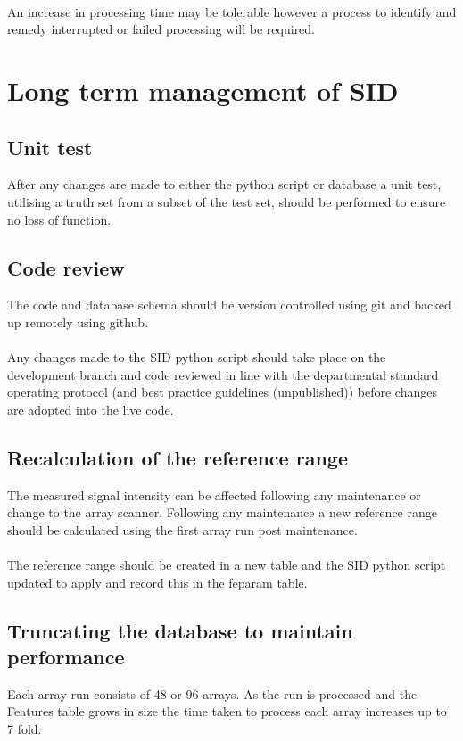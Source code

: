 \paragraph*{}
An increase in processing time may be tolerable however a process to identify and remedy interrupted or failed processing will be required. 

\section{Long term management of SID}
\subsection{Unit test}
After any changes are made to either the python script or database a unit test, utilising a truth set from a subset of the test set, should be performed to ensure no loss of function.

\subsection{Code review}
The code and database schema should be version controlled using git and backed up remotely using github. 
\paragraph*{}
Any changes made to the SID python script should take place on the development branch and code reviewed in line with the departmental standard operating protocol (and best practice guidelines (unpublished)) before changes are adopted into the live code.
 
\subsection{Recalculation of the reference range}
The measured signal intensity can be affected following any maintenance or change to the array scanner. Following any maintenance a new reference range should be calculated using the first array run post maintenance. 
\paragraph*{}
The reference range should be created in a new table and the SID python script updated to apply and record this in the feparam table.

\subsection{Truncating the database to maintain performance}
Each array run consists of 48 or 96 arrays. As the run is processed and the Features table grows in size the time taken to process each array increases up to 7 fold.
